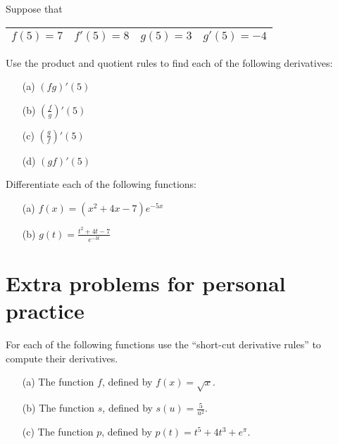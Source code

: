 \documentclass[handout,nooutcomes]{ximera}
\begin{document}
\begin{problem}
    Suppose that
  \begin{center}
    \begin{tabular}{cccc}
      \toprule
      $f(5) = 7$ & $f'(5) = 8$ & $g(5) = 3$ & $g'(5) = -4$\\
      \bottomrule
    \end{tabular}
  \end{center}
  Use the product and quotient rules to find each of the following derivatives:
  \begin{itemize}
    \item[(a)]
      $(fg)'(5)$

    \item[(b)]
      $\displaystyle \left(\frac{f}{g}\right)'(5)$

    \item[(c)]
      $\displaystyle \left(\frac{g}{f}\right)'(5)$

    \item[(d)]
      $(gf)'(5)$
  \end{itemize}
\end{problem}

\begin{problem}
  Differentiate each of the following functions:
  \begin{itemize}
    \item[(a)]
      $f(x) = (x^2 + 4x - 7) e^{-5x}$

    \item[(b)]
      $\displaystyle g(t) = \frac{t^2 + 4t - 7}{e^{-3t}}$
  \end{itemize}
\end{problem}

\section{Extra problems for personal practice}
\begin{problem}
  For each of the following functions use the ``short-cut derivative rules'' to compute their derivatives.
  \begin{itemize}
    \item[(a)]
      The function $f$, defined by $f(x) = \sqrt{x}$.

    \item[(b)]
      The function $s$, defined by $\displaystyle s(u) = \frac{5}{u^2}$.

    \item[(c)]
      The function $p$, defined by $p(t) = t^5 + 4t^3 + e^\pi$.
  \end{itemize}
\end{problem}
\end{document}
